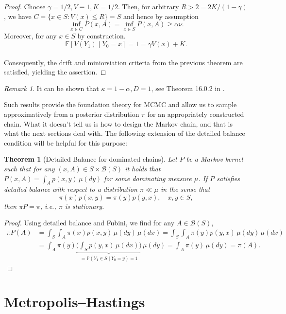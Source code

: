 \documentclass[
]{book}
\newtheorem{theorem}{Theorem}[chapter]
\theoremstyle{definition}
\theoremstyle{definition}
\theoremstyle{definition}
\theoremstyle{definition}
\theoremstyle{remark}
\newtheorem*{remark}{Remark}
\begin{document}
\begin{proof}
Choose \(\gamma = 1/2, V \equiv 1, K = 1/2\). Then, for arbitrary \(R > 2 = 2K/(1-\gamma)\), we have \(C = \{x \in S: V(x) \leq R\} = S\) and hence by assumption
\[\inf_{x \in C} P(x,A) = \inf_{x \in S} P(x,A)  \geq \alpha \nu.\]
Moreover, for any \(x \in S\) by construction.
\[\mathbb{E}[V(Y_1) \mid Y_0 = x] = 1 = \gamma V(x) +K.\]\\
Consequently, the drift and miniorsiation criteria from the previous theorem are satisfied, yielding the assertion.
\end{proof}

\begin{remark}
It can be shown that \(\kappa = 1 - \alpha, D=1\), see Theorem 16.0.2 in \citep{meyntweedie}.
\end{remark}

Such results provide the foundation theory for MCMC and allow us to sample approximatively from a posterior distribution \(\pi\) for an appropriately constructed chain. What it doesn't tell us is how to design the Markov chain, and that is what the next sections deal with. The following extension of the detailed balance condition will be helpful for this purpose:

\begin{theorem}[Detailed Balance for dominated chains]
\protect\hypertarget{thm:reversibility}{}\label{thm:reversibility}Let \(P\) be a Markov kernel such that for any \((x,A) \in S \times \mathcal{B}(S)\) it holds that \(P(x,A) = \int_A p(x,y) \,\mu(dy)\) for some dominating measure \(\mu\). If \(P\) satisfies detailed balance with respect to a distribution \(\pi \ll \mu\) in the sense that
\[\pi(x)p(x,y) = \pi(y)p(y,x), \quad x,y \in S,\]
then \(\pi P = \pi\), i.e., \(\pi\) is stationary.
\end{theorem}

\begin{proof}
Using detailed balance and Fubini, we find for any \(A \in \mathcal{B}(S)\),
\begin{align*} 
\pi P(A) &= \int_S \int_A \pi(x) p(x,y) \, \mu(dy)\, \mu(dx) =\int_S \int_A \pi(y) p(y,x) \, \mu(dy)\, \mu(dx)\\
&= \int_A \pi(y) \underbrace{\Big(\int_S p(y,x) \, \mu(dx)\Big)}_{= \mathbb{P}(Y_1 \in S \mid Y_0 = y) = 1} \, \mu(dy) = \int_A \pi(y) \, \mu(dy) = \pi(A). 
\end{align*}
\end{proof}

\section{Metropolis--Hastings}\label{metropolishastings}
\end{document}
